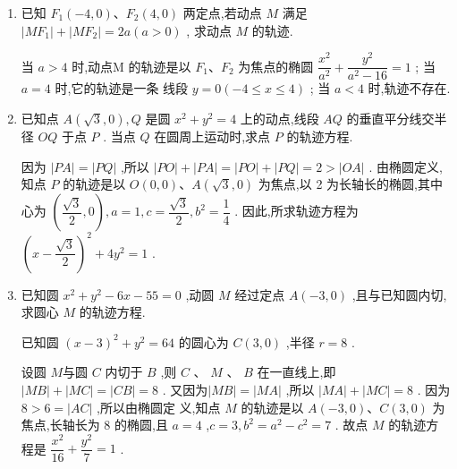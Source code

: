 \begin{enumerate}
    \item 已知 ${F}_{1}\left( {-4,0}\right) \text{、}{F}_{2}\left( {4,0}\right)$ 两定点,若动点 $M$ 满足 $\left| {M{F}_{1}}\right|  + \left| {M{F}_{2}}\right|  = {2a}\left( {a > 0}\right)$ , 求动点 $M$ 的轨迹.
    \begin{jieda}
         当 $a > 4$ 时,动点M  的轨迹是以 $ {F}_{1}\text{、}{F}_{2} $ 为焦点的椭圆 $ \dfrac{{x}^{2}}{{a}^{2}} + \dfrac{{y}^{2}}{{a}^{2} - {16}} = 1 $ ; 当 $ a = 4 $ 时,它的轨迹是一条
线段 $ y = 0\left( {-4 \leq  x \leq  4}\right) $ ; 当 $ a < 4 $ 时,轨迹不存在.
    \end{jieda}

    \item 已知点 $A\left( {\sqrt{3},0}\right) ,Q$ 是圆 ${x}^{2} + {y}^{2} = 4$ 上的动点,线段 ${AQ}$ 的垂直平分线交半径 ${OQ}$ 于点 $P$ . 当点 $Q$ 在圆周上运动时,求点 $P$ 的轨迹方程.
    \begin{jieda}
        因为 $\left| {PA}\right|  = \left| {PQ}\right|$ ,所以 $\left| {PO}\right|  + \left| {PA}\right|  = \left| {PO}\right|  + \left| {PQ}\right|  = 2 > \left| {OA}\right|$ .
由椭圆定义,知点 $P$ 的轨迹是以 $O\left( {0,0}\right) \text{、}A\left( {\sqrt{3},0}\right)$ 为焦点,以 2 为长轴长的椭圆,其中
心为 $\left( {\dfrac{\sqrt{3}}{2},0}\right) ,a = 1,c = \dfrac{\sqrt{3}}{2},{b}^{2} = \dfrac{1}{4}$ . 因此,所求轨迹方程为 ${\left( x - \dfrac{\sqrt{3}}{2}\right) }^{2} + 4{y}^{2} = 1$ .
    \end{jieda}
    
    \item 已知圆 ${x}^{2} + {y}^{2} - {6x} - {55} = 0$ ,动圆 $M$ 经过定点 $A\left( {-3,0}\right)$ ,且与已知圆内切,求圆心 $M$ 的轨迹方程.
    \begin{jieda}
        已知圆 ${\left( x - 3\right) }^{2} + {y}^{2} = {64}$ 的圆心为 $C\left( {3,0}\right)$ ,半径 $r = 8$ . 
        
        设圆 $M$与圆 $C$ 内切于 $B$ ,则 $C$ 、 $M$ 、 $B$ 在一直线上,即 $\left| {MB}\right|  + \left| {MC}\right|  = \left| {CB}\right|  = 8$ . 又因为$\left| {MB}\right|  = \left| {MA}\right|$ ,所以 $\left| {MA}\right|  + \left| {MC}\right|  = 8$ . 因为 $8 > 6 = \left| {AC}\right|$ ,所以由椭圆定
        义,知点 $M$ 的轨迹是以 $A\left( {-3,0}\right) \text{、}C\left( {3,0}\right)$ 为焦点,长轴长为 8 的椭圆,且 $a = 4$ ,$c = 3,{b}^{2} = {a}^{2} - {c}^{2} = 7$ . 故点 $M$ 的轨迹方程是 $\dfrac{{x}^{2}}{16} + \dfrac{{y}^{2}}{7} = 1$ .
    \end{jieda}
\end{enumerate}


